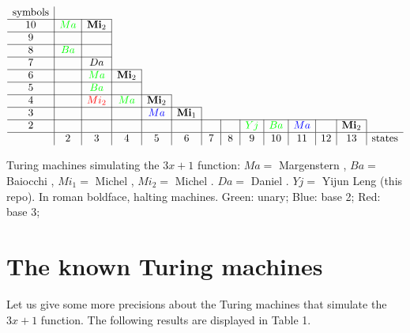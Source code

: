 \documentclass[10pt]{article}
\begin{document}
\begin{table}
$$\begin{array}{c|c|c|c|c|c|c|c|c|c|c|c|c|c}
\mbox{symbols} & \multicolumn{13}{c}{}\\                                                \cline{1-3}
10             & \textcolor{green}{Ma}    & \mbox{\bf Mi}_2& \multicolumn{11}{c}{}\\                       \cline{1-3}
9              &       &      &\multicolumn{11}{c}{}\\                                  \cline{1-3}
8              & \textcolor{green}{Ba}    &      &\multicolumn{11}{c}{}\\                                  \cline{1-3}
7              &       & Da   			 &\multicolumn{11}{c}{}\\                                  \cline{1-4}
6              &       & \textcolor{green}{Ma}   &  \mbox{\bf Mi}_2 & \multicolumn{10}{c}{}\\          \cline{1-4}
5              &       & \textcolor{green}{Ba}   &                  & \multicolumn{10}{c}{}\\          \cline{1-5}
4              &       & \textcolor{red}{Mi_2} & \textcolor{green}{Ma}               &\mbox{\bf Mi}_2 & \multicolumn{9}{c}{}\\         \cline{1-6}
3              &       &      &                  & \textcolor{blue}{Ma}   &\mbox{\bf Mi}_1 & \multicolumn{8}{c}{}\\  \cline{1-13}
2              &       &      &    &      &      &     &     & \textcolor{green}{Yj}  & \textcolor{green}{Ba}  & \textcolor{blue}{Ma} & & \mbox{\bf Mi}_2\\  \hline
               & 2     & 3    & 4  & 5    &\,6\, &\,7\,&\,8\,&\,9\,& 10  & 11 & 12 & 13 & \mbox{states}
\end{array}$$
\caption{Turing machines simulating the $3x + 1$ function:
$Ma=$ Margenstern \cite{Ma98,Ma00},
$Ba=$ Baiocchi \cite{Ba98},
$Mi_1=$ Michel \cite{Mi93},
$Mi_2=$ Michel \cite{Mi14}.
$Da=$ Daniel \cite{Da24}.
$Yj=$ Yijun Leng (this repo).
In roman boldface, halting machines.
Green: unary;
Blue: base 2;
Red: base 3;
}
\end{table}

\section{The known Turing machines}
Let us give some more precisions about the Turing machines that simulate
the $3x + 1$ function. The following results are displayed in Table 1.
\end{document}
